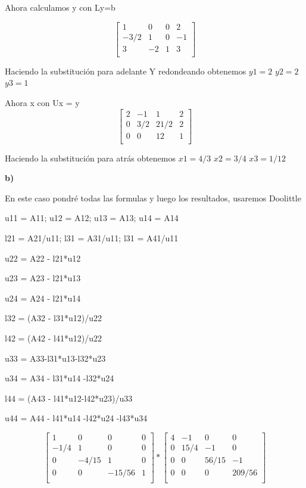 \documentclass[12pt]{article}
\begin{document}
Ahora calculamos y con Ly=b

\[
\begin{bmatrix}
1 & 0 & 0& 2\\
-3/2 &  1& 0& -1\\
3 & -2 & 1& 3\\
\end{bmatrix}
\]


Haciendo la substitución para adelante Y redondeando obtenemos
$y1 = 2$    $y2 =2$  $y3 =1$ 

Ahora x con Ux = y
\[
\begin{bmatrix}
2 & -1 & 1& 2\\
0 & 3/2 & 21/2& 2\\
0 & 0 & 12& 1\\
\end{bmatrix}
\]

Haciendo la substitución para atrás obtenemos
$x1 = 4/3$    $x2 = 3/4$  $x3 =1/12$ 



\textbf{b)}

En este caso pondré todas las formulas y luego los resultados, usaremos Doolittle

u11 = A11; u12 = A12;  u13 = A13; u14 = A14

l21 = A21/u11; l31 = A31/u11; l31 = A41/u11

u22 = A22 - l21*u12

u23 = A23 - l21*u13

u24 = A24 - l21*u14

l32 = (A32 - l31*u12)/u22

l42 = (A42 - l41*u12)/u22

u33 = A33-l31*u13-l32*u23

u34 = A34 - l31*u14 -l32*u24

l44 = (A43 - l41*u12-l42*u23)/u33

u44 = A44 - l41*u14 -l42*u24 -l43*u34

\[
\begin{bmatrix}
1 & 0 & 0& 0\\
-1/4 & 1 & 0& 0\\
0 & -4/15 & 1& 0\\
0 & 0 & -15/56& 1\\
\end{bmatrix}
*
\begin{bmatrix}
4 & -1 & 0& 0\\
0 & 15/4 & -1& 0\\
0 & 0 & 56/15& -1\\
0 & 0 & 0& 209/56\\
\end{bmatrix}
\]
\end{document}
